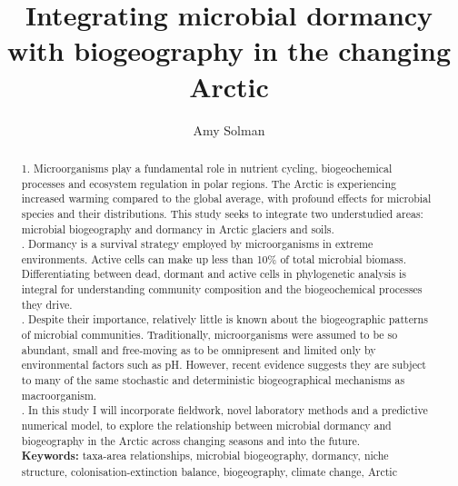 \documentclass[a4paper, twoside]{report}
\title{Integrating microbial dormancy with biogeography in the changing Arctic}
\author{Amy Solman}
\begin{document}



\renewcommand{\abstractname}{Abstract}
\begin{abstract}
1.  Microorganisms play a fundamental role in nutrient cycling, biogeochemical processes and ecosystem regulation in polar regions. The Arctic is experiencing increased warming compared to the global average, with profound effects for microbial species and their distributions. This study seeks to integrate two understudied areas: microbial biogeography and dormancy in Arctic glaciers and soils. \\

. Dormancy is a survival strategy employed by microorganisms in extreme environments. Active cells can make up less than 10\% of total microbial biomass. Differentiating between dead, dormant and active cells in phylogenetic analysis is integral for understanding community composition and the biogeochemical processes they drive. \\

. Despite their importance, relatively little is known about the biogeographic patterns of microbial communities. Traditionally, microorganisms were assumed to be so abundant, small and free-moving as to be omnipresent and limited only by environmental factors such as pH. However, recent evidence suggests they are subject to many of the same stochastic and deterministic biogeographical mechanisms as macroorganism.\\

. In this study I will incorporate fieldwork, novel laboratory methods and a predictive numerical model, to explore the relationship between microbial dormancy and biogeography in the Arctic across changing seasons and into the future. \\

\noindent \textbf{Keywords:} taxa-area relationships, microbial biogeography, dormancy, niche structure, colonisation-extinction balance, biogeography, climate change, Arctic 
\end{abstract}

\tableofcontents








\end{document}
